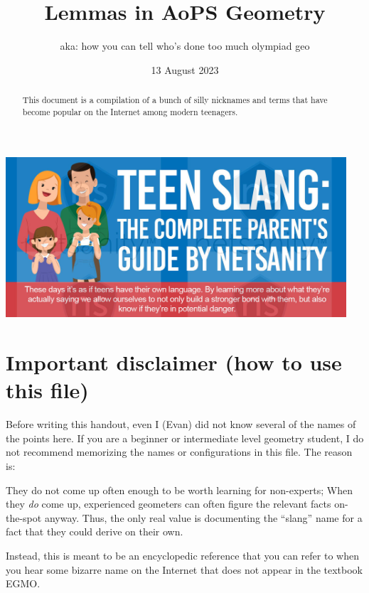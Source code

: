 \documentclass[11pt]{scrartcl}
\begin{document}
\title{Lemmas in AoPS Geometry}
\subtitle{aka: how you can tell who's done too much olympiad geo}
\date{13 August 2023}
\maketitle

\begin{center}
  \includegraphics[width=0.95\textwidth]{slang.jpg}
\end{center}

\begin{abstract}
  This document is a compilation of a bunch of silly nicknames and terms
  that have become popular on the Internet among modern teenagers.
\end{abstract}

\section*{Important disclaimer (how to use this file)}
Before writing this handout, even I (Evan)
did not know several of the names of the points here.
If you are a beginner or intermediate level geometry student,
\alert{I do not recommend memorizing the names or configurations in this file}.
The reason is:
\begin{itemize}
  \ii They do not come up often enough to be worth learning for non-experts;
  \ii When they \emph{do} come up, experienced geometers can often figure
  the relevant facts on-the-spot anyway. Thus, the only real value is
  documenting the ``slang'' name for a fact that they could derive on their own.
\end{itemize}
Instead, this is meant to be an encyclopedic reference that you can refer to
when you hear some bizarre name on the Internet that does not appear
in the textbook EGMO.

\newpage

\tableofcontents
\end{document}
